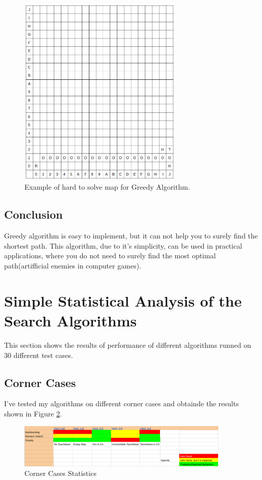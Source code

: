 \documentclass[a4apper,11pt]{article}
\begin{document}
\begin{figure}[h]
    \centering
    \includegraphics[width=0.7\textwidth]{pic/hard-greedy.png}
    \caption{Example of hard to solve map for Greedy Algorithm.}
    \label{pic:hard-greedy}
\end{figure}

\subsection{Conclusion}
Greedy algorithm is easy to implement, but it can not help you to surely find the shortest path. This algorithm, due to it's simplicity, can be used in practical applications, where you do not need to surely find the most optimal path(artifficial enemies in computer games).

\section{Simple Statistical Analysis of the Search Algorithms}

This section shows the results of performance of different algorithms runned on 30 different test cases.

\subsection{Corner Cases}
I've tested my algorithms on different corner cases and obtainde the results shown in Figure \ref{pic:stat:corner}.

\begin{figure}[h]
    \centering
    \includegraphics[width=0.9\textwidth]{pic/Corner_Cases.png}
    \caption{Corner Cases Statistics}
    \label{pic:stat:corner}
\end{figure}
\end{document}
